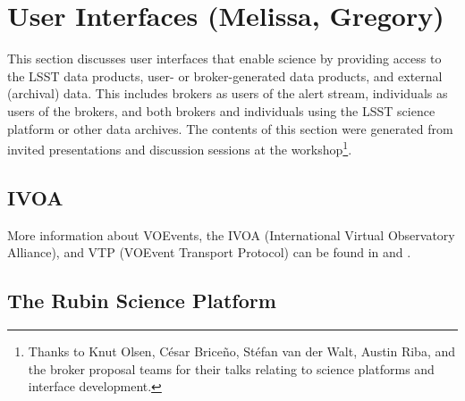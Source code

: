 \section{User Interfaces (Melissa, Gregory)} \label{sec:interfaces}



This section discusses user interfaces that enable science by providing access to the LSST data products, user- or broker-generated data products, and external (archival) data.
This includes brokers as users of the alert stream, individuals as users of the brokers, and both brokers and individuals using the LSST science platform or other data archives.
The contents of this section were generated from invited presentations and discussion sessions at the workshop\footnote{Thanks to Knut Olsen, César Briceño, Stéfan van der Walt, Austin Riba, and the broker proposal teams for their talks relating to science platforms and interface development.}.

\subsection{IVOA}\label{ssec:interfaces_ivoa}


More information about VOEvents, the IVOA (International Virtual Observatory Alliance), and VTP (VOEvent Transport Protocol) can be found in \citet{2011ivoa.spec.0711S} and \citet{2017arXiv170901264A}.


\subsection{The Rubin Science Platform}\label{ssec:interfaces_rsp}

